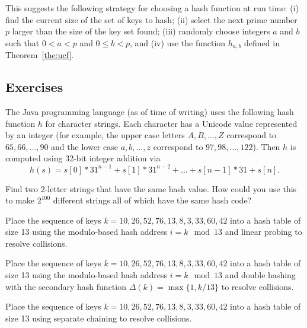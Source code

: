 This suggests the following strategy for 
choosing a hash function at run time: (i) find 
the current size of the set of keys to hash; 
(ii) select the next 
prime number \(p\) larger than the size of the key set found;
({iii}) randomly choose integers \(a\) and \(b\)
such that \(0 < a < p\) and \(0 \le b < p\), and 
({iv}) use the function \(h_{a,b}\) 
defined in Theorem~\ref{the:ucf}.


\subsection*{Exercises}

\begin{Exercise}\label{exr:java:hash}
The Java programming language (as of time of writing)
uses the following hash function $h$ for character strings. 
Each character has a Unicode value represented by an integer (for example, the 
upper case letters $A, B, \dots, Z$ correspond to $65, 66, \dots, 90$ and the 
lower case $a, b, \dots, z$ correspond to $97, 98, \dots, 122$). Then 
$h$ is computed using 32-bit integer addition via
$$h(s) = s[0]*31^{n-1} + s[1]*31^{n-2} + \dots + s[n-1]*31 + s[n].$$

Find two 2-letter strings that have the same hash value. How could you use this 
to make $2^{100}$ different strings all of which have the same hash code?
\end{Exercise}

\begin{Exercise}\label{exr:hash:oalp}
Place the sequence of keys \(k=10, 26, 52, 76, 13, 8, 3, 33, 60, 42\) 
into a hash table of size 13 using the modulo-based hash address \(i = k \mod 13\) 
and linear probing to resolve collisions.
\end{Exercise}

\begin{Exercise}\label{exr:hash:oadh}

Place the sequence of keys \(k=10, 26, 52, 76, 13, 8, 3, 33, 60, 42\) 
into a hash table of size 13 using the modulo-based hash address \(i = k \mod 13\) 
and double hashing with the secondary hash function 
\(\Delta(k)=\max\{1, k/13 \}\) to resolve collisions.
\end{Exercise}

\begin{Exercise}\label{exr:hash:sc}
Place the sequence of keys \(k=10, 26, 52, 76, 13, 8, 3, 33, 60, 42\) 
into a hash table of size 13 using separate chaining to resolve collisions.
\end{Exercise}


